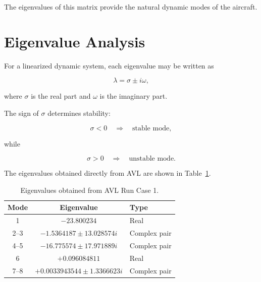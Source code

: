 \documentclass[11pt,a4paper]{article}
\begin{document}
The eigenvalues of this matrix provide the natural dynamic modes of the
aircraft.

\section{Eigenvalue Analysis}

For a linearized dynamic system, each eigenvalue may be written as

\begin{equation}
\lambda=\sigma\pm i\omega,
\end{equation}

where $\sigma$ is the real part and $\omega$ is the imaginary part.

The sign of $\sigma$ determines stability:

\begin{equation}
\sigma<0
\quad\Rightarrow\quad
\text{stable mode},
\end{equation}

while

\begin{equation}
\sigma>0
\quad\Rightarrow\quad
\text{unstable mode}.
\end{equation}

The eigenvalues obtained directly from AVL are shown in
Table~\ref{tab:eigenvalues}.

\begin{table}[H]
\centering
\caption{Eigenvalues obtained from AVL Run Case 1.}
\label{tab:eigenvalues}
\begin{tabular}{ccl}
\toprule
Mode & Eigenvalue & Type \\
\midrule
1 &
$-23.800234$ &
Real \\

2--3 &
$-1.5364187\pm13.028574i$ &
Complex pair \\

4--5 &
$-16.775574\pm17.971889i$ &
Complex pair \\

6 &
$+0.096084811$ &
Real \\

7--8 &
$+0.0033943544\pm1.3366623i$ &
Complex pair \\

\bottomrule
\end{tabular}
\end{table}
\end{document}
